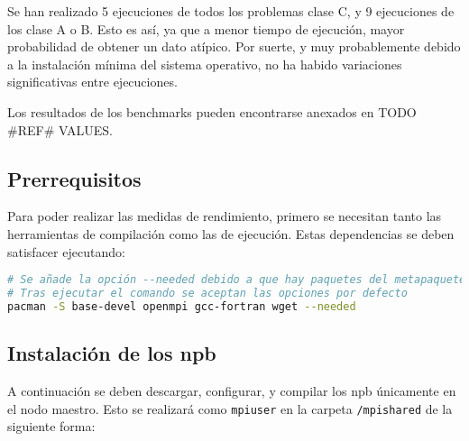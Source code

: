 Se han realizado 5 ejecuciones de todos los problemas clase C, y 9 ejecuciones de los clase A o B. Esto es así, ya que a menor tiempo de ejecución, mayor probabilidad de obtener un dato atípico. Por suerte, y muy probablemente debido a la instalación mínima del sistema operativo, no ha habido variaciones significativas entre ejecuciones.

Los resultados de los benchmarks pueden encontrarse anexados en TODO \#REF\# VALUES.

\subsection{Prerrequisitos}
Para poder realizar las medidas de rendimiento, primero se necesitan tanto las herramientas de compilación como las de ejecución. Estas dependencias se deben satisfacer ejecutando:

\begin{lstlisting}[language=bash]
# Se añade la opción --needed debido a que hay paquetes del metapaquete base-devel que ya están instalados, y no es necesario reinstalar.
# Tras ejecutar el comando se aceptan las opciones por defecto
pacman -S base-devel openmpi gcc-fortran wget --needed
\end{lstlisting}

\subsection{Instalación de los \acrshort{npb}}
A continuación se deben descargar, configurar, y compilar los \acrlong{npb} únicamente en el nodo maestro. Esto se realizará como \texttt{mpiuser} en la carpeta \texttt{/mpishared} de la siguiente forma:

